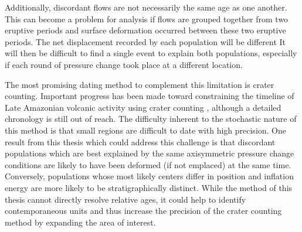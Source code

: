 Additionally, discordant flows are not necessarily the same age as one another. This can become a problem for analysis if flows are grouped together from two eruptive periods and surface deformation occurred between these two eruptive periods. The net displacement recorded by each population will be different It will then be difficult to find a single event to explain both populations, especially if each round of pressure change took place at a different location.

The most promising dating method to complement this limitation is crater counting. Important progress has been made toward constraining the timeline of Late Amazonian volcanic activity using crater counting \parencite{kneissl_map-projection-independent_2011,robbins_volcanic_2011,
robbins_large_2013, platz_crater-based_2013}, although a detailed chronology is still out of reach. The difficulty inherent to the stochastic nature of this method is that small regions are difficult to date with high precision. One result from this thesis which could address this challenge is that discordant populations which are best explained by the same axisymmetric pressure change conditions are likely to have been deformed (if not emplaced) at the same time. Conversely, populations whose most likely centers differ in position and inflation energy are more likely to be stratigraphically distinct. While the method of this thesis cannot directly resolve relative ages, it could help to identify contemporaneous units and thus increase the precision of the crater counting method by expanding the area of interest.